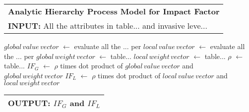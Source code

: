 \documentclass[12pt]{article}
\newcommand{\toB}[1]{\color{blue}#1\color{black}}
\begin{document}
		{
	\fontsize{10}{14}\selectfont
	{
		\setlength{\parindent}{-1em}
		
		{
			\fontsize{12}{18}\selectfont
			\begin{longtable}{p{6.65in}}
				\toprule
				\textbf{Analytic Hierarchy Process Model for Impact Factor}\\
				\textbf{INPUT:} All the attributes in table... and invasive leve... \\
				\bottomrule
			\end{longtable}
		}
		
		\vspace{-0.5em}
		\begin{algorithmic}
			\State \toB{$global\,value\,vector$ } $\gets$ evaluate all the ... per 
			\State \toB{$local\,value\,vector$ } $\gets$ evaluate all the ... per 
			\State \toB{$global\,weight\,vector$ } $\gets$ table...
			\State \toB{$local\,weight\,vector$ } $\gets$ table...
			\State \toB{$\rho$ } $\gets$ table...
			\State \toB{$IF_G$ } $\gets$ \toB{$\rho$ } times dot product of \toB{$global\,value\,vector$ } and \toB{$global\,weight\,vector$ }
			\State \toB{$IF_L$ } $\gets$ \toB{$\rho$ } times dot product of \toB{$local\,value\,vector$ } and \toB{$local\,weight\,vector$ }
		\end{algorithmic}
		
		{
			\fontsize{12}{18}\selectfont
			\begin{longtable}{p{6.6in}}
				\toprule
				\textbf{OUTPUT:} \toB{$IF_G$ } and \toB{$IF_L$}\\
				\bottomrule
			\end{longtable}
		}
	}
}	



\newpage
\newrefcontext
\printbibliography
\end{document}
